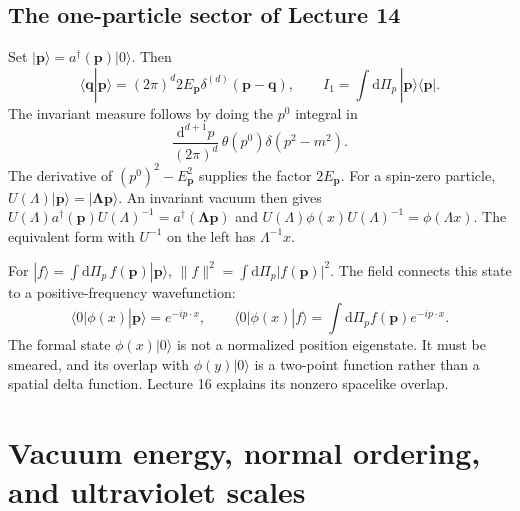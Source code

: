 \documentclass[11pt]{article}
\newcommand{\dd}{\mathrm{d}}
\newcommand{\vac}{\lvert0\rangle}
\newcommand{\vbra}{\langle0\rvert}
\begin{document}
\subsection{The one-particle sector of Lecture 14}
Set \(|\bm p\rangle=a^\dagger(\bm p)\vac\). Then
\begin{equation}
 \langle\bm q|\bm p\rangle=(2\pi)^d2E_{\bm p}\delta^{(d)}(\bm p-\bm q),
 \qquad I_1=\int\dd\Pi_p\,|\bm p\rangle\langle\bm p|.
 \label{s-eq:1particle}
\end{equation}
The invariant measure follows by doing the \(p^0\) integral in
\[
 \frac{\dd^{d+1}p}{(2\pi)^d}\,\theta(p^0)\delta(p^2-m^2).
\]
The derivative of \((p^0)^2-E_{\bm p}^2\) supplies the factor \(2E_{\bm p}\).
For a spin-zero particle,
\(U(\Lambda)|\bm p\rangle=|\boldsymbol{\Lambda p}\rangle\).
An invariant vacuum then gives
\(U(\Lambda)a^\dagger(\bm p)U(\Lambda)^{-1}=a^\dagger(\boldsymbol{\Lambda p})\)
and \(U(\Lambda)\phi(x)U(\Lambda)^{-1}=\phi(\Lambda x)\).
The equivalent form with \(U^{-1}\) on the left has \(\Lambda^{-1}x\).

For \(|f\rangle=\int\dd\Pi_p\,f(\bm p)|\bm p\rangle\),
\(\|f\|^2=\int\dd\Pi_p|f(\bm p)|^2\). The field connects this state to a
positive-frequency wavefunction:
\begin{equation}
 \vbra\phi(x)|\bm p\rangle=e^{-ip\cdot x},\qquad
 \vbra\phi(x)|f\rangle=\int\dd\Pi_p f(\bm p)e^{-ip\cdot x}.
 \label{s-eq:wavefunction}
\end{equation}
The formal state \(\phi(x)\vac\) is not a normalized position eigenstate.
It must be smeared, and its overlap with \(\phi(y)\vac\) is a two-point
function rather than a spatial delta function. Lecture 16 explains its
nonzero spacelike overlap.

\section{Vacuum energy, normal ordering, and ultraviolet scales}
\end{document}
